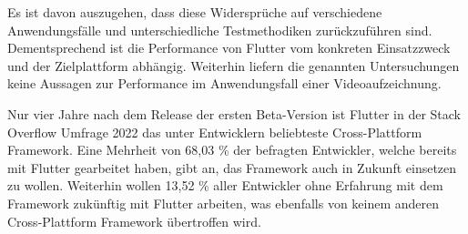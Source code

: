 Es ist davon auszugehen, dass diese Widersprüche auf verschiedene Anwendungsfälle und unterschiedliche Testmethodiken zurückzuführen sind.
Dementsprechend ist die Performance von Flutter vom konkreten Einsatzzweck und der Zielplattform abhängig.
Weiterhin liefern die genannten Untersuchungen keine Aussagen zur Performance im Anwendungsfall einer Videoaufzeichnung.

Nur vier Jahre nach dem Release der ersten Beta-Version \cite{Sharma_Flutter} ist Flutter in der Stack Overflow Umfrage 2022 \cite{Stackoverflow_2022} das unter Entwicklern beliebteste Cross-Plattform Framework.
Eine Mehrheit von 68,03 \% der befragten Entwickler, welche bereits mit Flutter gearbeitet haben, gibt an, das Framework auch in Zukunft einsetzen zu wollen.
Weiterhin wollen 13,52 \% aller Entwickler ohne Erfahrung mit dem Framework zukünftig mit Flutter arbeiten, was ebenfalls von keinem anderen Cross-Plattform Framework übertroffen wird.

